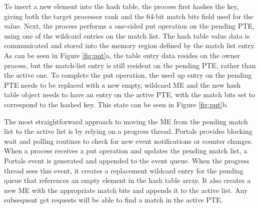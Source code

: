 
To insert a new element into the hash table, the process first hashes
the key, giving both the target processor rank and the 64-bit match
bits field used for the value. Next, the process performs a one-sided
put operation on the pending PTE, using one of the wildcard entries on
the match list. The hash table value data is communicated and stored
into the memory region defined by the match list entry. As can be seen
in Figure \ref{fig:put}a, the table entry data resides on the owner
process, but the match-list entry is still resident on the pending
PTE, rather than the active one. To complete the put operation, the
used up entry on the pending PTE needs to be replaced with a new empty,
wildcard ME and the new hash table object needs to have an entry on
the active PTE, with the match bits set to correspond to the hashed
key. This state can be seen in Figure \ref{fig:put}b. 

The most straightforward approach to moving the ME from the pending
match list to the active list is by relying on a progress
thread. Portals provides blocking wait and polling routines to check
for new event notifications or counter changes. When a process
receives a put operation and updates the pending match list, a Portals
event is generated and appended to the event queue. When the progress
thread sees this event, it creates a replacement wildcard entry for
the pending queue that references an empty element in the hash table
array. It also creates a new ME with the appropriate match bits and
appends it to the active list. Any subsequent get requests will be
able to find a match in the active PTE.









